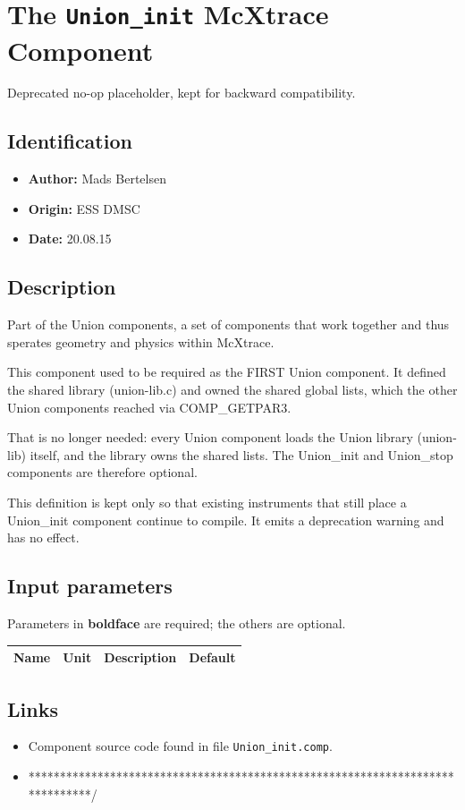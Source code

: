 \section{The \texttt{Union\_init} McXtrace Component}
Deprecated no-op placeholder, kept for backward compatibility.

\subsection*{Identification}
\begin{itemize}
  \item \textbf{Author:} Mads Bertelsen
  \item \textbf{Origin:} ESS DMSC
  \item \textbf{Date:} 20.08.15
\end{itemize}

\subsection*{Description}
Part of the Union components, a set of components that work together and thus sperates geometry and physics within McXtrace.

This component used to be required as the FIRST Union component. It defined the shared library (union-lib.c) and owned the shared global lists, which the other Union components reached via COMP\_GETPAR3.

That is no longer needed: every Union component loads the Union library (union-lib) itself, and the library owns the shared lists. The Union\_init and Union\_stop components are therefore optional.

This definition is kept only so that existing instruments that still place a Union\_init component continue to compile. It emits a deprecation warning and has no effect.

\subsection*{Input parameters}
Parameters in \textbf{boldface} are required; the others are optional.

\begin{longtable}{p{}p{}p{}p{}}
\toprule
\textbf{Name} & \textbf{Unit} & \textbf{Description} & \textbf{Default} \\
\midrule
\endhead
\bottomrule
\end{longtable}

\subsection*{Links}
\begin{itemize}
  \item Component source code found in file \texttt{Union\_init.comp}.
  \item ******************************************************************************/
\end{itemize}

